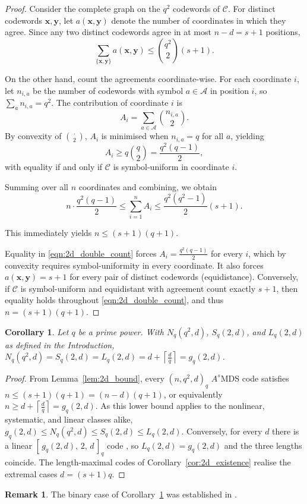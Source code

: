 \documentclass[12pt, letterpaper]{article}
\theoremstyle{plain}
\newtheorem{corollary}[theorem]{Corollary}
\theoremstyle{definition}
\newtheorem{remark}[theorem]{Remark}
\newcommand{\A}{{\mathcal{A}}}
\begin{document}
	\begin{proof}
		Consider the complete graph on the $q^2$ codewords of $\mathcal{C}$. For distinct codewords $\mathbf{x}, \mathbf{y}$, let $a(\mathbf{x},\mathbf{y})$ denote the number of coordinates in which they agree. Since any two distinct codewords agree in at most $n-d = s+1$ positions,
		\[
		\sum_{\{\mathbf{x},\mathbf{y}\}} a(\mathbf{x},\mathbf{y}) \le \binom{q^2}{2}(s+1).
		\]
		
		On the other hand, count the agreements coordinate-wise. For each coordinate $i$, let $n_{i,a}$ be the number of codewords with symbol $a\in\A$ in position $i$, so $\sum_a n_{i,a}=q^2$. The contribution of coordinate $i$ is
		\[
		A_i = \sum_{a\in\A} \binom{n_{i,a}}{2}.
		\]
		By convexity of $\binom{\cdot}{2}$, $A_i$ is minimised when $n_{i,a}=q$ for all $a$, yielding
		\[
		A_i \ge q\binom{q}{2} = \frac{q^2(q-1)}{2},
		\]
		with equality if and only if $\mathcal{C}$ is symbol-uniform in coordinate $i$.
		
		Summing over all $n$ coordinates and combining, we obtain
		\begin{equation}\label{eqn:2d_double_count}
			n \cdot \frac{q^2(q-1)}{2} \le \sum_{i=1}^n A_i \le \frac{q^2(q^2-1)}{2}(s+1).
		\end{equation}
		
		This immediately yields $n \le (s+1)(q+1)$.
		
		Equality in \eqref{eqn:2d_double_count} forces $A_i = \frac{q^2(q-1)}{2}$ for every $i$, which by convexity requires symbol-uniformity in every coordinate. It also forces $a(\mathbf{x},\mathbf{y}) = s+1$ for every pair of distinct codewords (equidistance). Conversely, if $\mathcal{C}$ is symbol-uniform and equidistant with agreement count exactly $s+1$, then equality holds throughout \eqref{eqn:2d_double_count}, and thus $n = (s+1)(q+1)$.
	\end{proof}
	
	\begin{corollary}\label{cor:2d_LM_GB}
	Let $q$ be a prime power. With $N_q(q^2,d)$, $S_q(2,d)$, and $L_q(2,d)$ as defined in the Introduction, $N_q(q^2,d)=S_q(2,d)=L_q(2,d)= d+\left\lceil \frac{d}{q}\right\rceil=g_q(2,d)$.
	\end{corollary}
	\begin{proof}
		From Lemma~\ref{lem:2d_bound}, every $(n,q^2,d)_q$ $A^s$MDS code satisfies $n\le (s+1)(q+1)=(n-d)(q+1)$, or equivalently $n\ge d+\left\lceil \frac{d}{q}\right\rceil =g_q(2,d)$. As this lower bound applies to the nonlinear, systematic, and linear classes alike, $g_q(2,d)\le N_q(q^2,d)\le S_q(2,d)\le L_q(2,d)$. Conversely, for every $d$ there is a linear $[\,g_q(2,d),\,2,\,d\,]_q$ code \cite{SS65}, so $L_q(2,d)=g_q(2,d)$ and the three lengths coincide.  The length-maximal codes of Corollary~\ref{cor:2d_existence} realise the extremal cases $d=(s+1)q$.
	\end{proof}
	\begin{remark}
		The binary case of Corollary~\ref{cor:2d_LM_GB} was established in \cite{Guerrini2015Optimal}.
	\end{remark}
\end{document}
